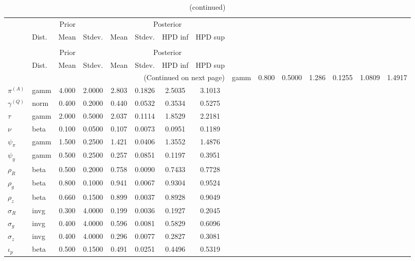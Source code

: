  
\begin{center}
\begin{longtable}{llcccccc} 
\caption{Results from Metropolis-Hastings (parameters)}
 \label{Table:MHPosterior:1}\\
\toprule 
  & \multicolumn{3}{c}{Prior}  &  \multicolumn{4}{c}{Posterior} \\
  \cmidrule(r{.75em}){2-4} \cmidrule(r{.75em}){5-8}
  & Dist. & Mean  & Stdev. & Mean & Stdev. & HPD inf & HPD sup\\
\midrule \endfirsthead 
\caption{(continued)}\\\toprule 
  & \multicolumn{3}{c}{Prior}  &  \multicolumn{4}{c}{Posterior} \\
  \cmidrule(r{.75em}){2-4} \cmidrule(r{.75em}){5-8}
  & Dist. & Mean  & Stdev. & Mean & Stdev. & HPD inf & HPD sup\\
\midrule \endhead 
\bottomrule \multicolumn{8}{r}{(Continued on next page)} \endfoot 
\bottomrule \endlastfoot 
${r_{A}}$ & gamm &   0.800 & 0.5000 &   1.286& 0.1255 &  1.0809 &  1.4917 \\ 
${\pi^{(A)}}$ & gamm &   4.000 & 2.0000 &   2.803& 0.1826 &  2.5035 &  3.1013 \\ 
${\gamma^{(Q)}}$ & norm &   0.400 & 0.2000 &   0.440& 0.0532 &  0.3534 &  0.5275 \\ 
${\tau}$ & gamm &   2.000 & 0.5000 &   2.037& 0.1114 &  1.8529 &  2.2181 \\ 
${\nu}$ & beta &   0.100 & 0.0500 &   0.107& 0.0073 &  0.0951 &  0.1189 \\ 
${\psi_\pi}$ & gamm &   1.500 & 0.2500 &   1.421& 0.0406 &  1.3552 &  1.4876 \\ 
${\psi_y}$ & gamm &   0.500 & 0.2500 &   0.257& 0.0851 &  0.1197 &  0.3951 \\ 
${\rho_R}$ & beta &   0.500 & 0.2000 &   0.758& 0.0090 &  0.7433 &  0.7728 \\ 
${\rho_{g}}$ & beta &   0.800 & 0.1000 &   0.941& 0.0067 &  0.9304 &  0.9524 \\ 
${\rho_z}$ & beta &   0.660 & 0.1500 &   0.899& 0.0037 &  0.8928 &  0.9049 \\ 
${\sigma_R}$ & invg &   0.300 & 4.0000 &   0.199& 0.0036 &  0.1927 &  0.2045 \\ 
${\sigma_{g}}$ & invg &   0.400 & 4.0000 &   0.596& 0.0081 &  0.5829 &  0.6096 \\ 
${\sigma_z}$ & invg &   0.400 & 4.0000 &   0.296& 0.0077 &  0.2827 &  0.3081 \\ 
${\iota_p}$ & beta &   0.500 & 0.1500 &   0.491& 0.0251 &  0.4496 &  0.5319 \\ 
\end{longtable}
 \end{center}

